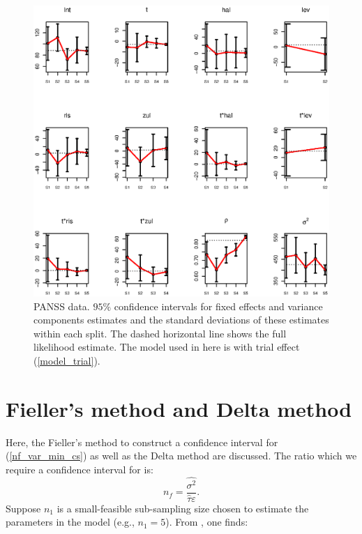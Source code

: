 \documentclass[11pt,a5paper,twoside]{book}
\begin{document}
{\begin{figure}[ht]
\centering
\includegraphics[width=\textwidth]{with_trial_split_by_split.eps}
\caption[PANSS data. $95\%$ confidence intervals for fixed effects and variance components estimates and the standard deviations of these estimates within each split (with trial model)]{PANSS data. $95\%$ confidence intervals for fixed effects and variance components estimates and the standard deviations of these estimates within each split. The dashed horizontal line shows the full likelihood estimate. The model used in here is with trial effect (\ref{model_trial}).} \label{fig_with_trial_split}
\end{figure}



\setcounter{equation}{0}
\section{Fieller's method and Delta method}
\label{app1}

Here, the Fieller's method to construct a confidence interval for (\ref{nf_var_min_cs}) as well as the Delta method  are discussed. The ratio which we require a confidence interval for is:
$$n_f=\frac{\hat{\sigma^2}}{\widehat{\tau} \varepsilon}.$$
Suppose $n_1$ is a small-feasible sub-sampling size chosen to estimate the parameters in the model (e.g., $n_1=5$). From \cite{Iddi2011}, one finds:



}
\end{document}
